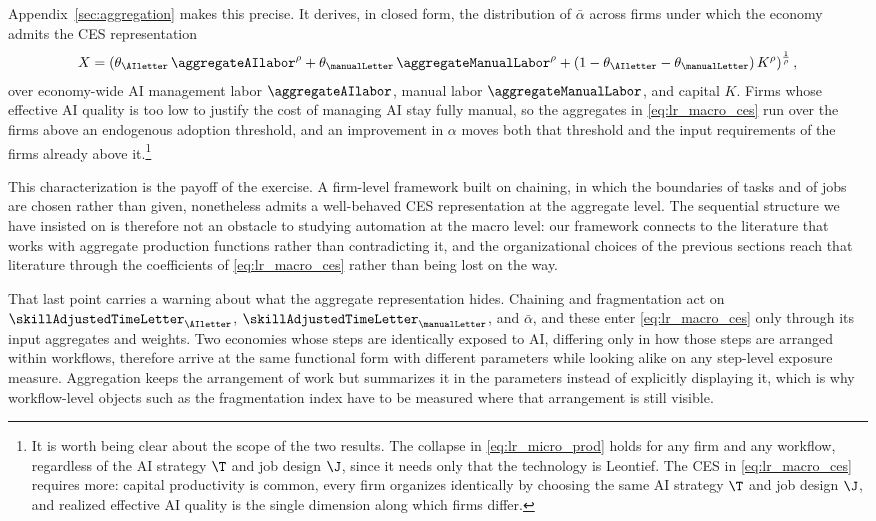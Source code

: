 Appendix~\ref{sec:aggregation} makes this precise.
It derives, in closed form, the distribution of $\bar{\alpha}$ across firms under which the economy admits the CES representation
\begin{align}
\label{eq:lr_macro_ces}
X = \left(\theta_{\AIletter}\,\aggregateAIlabor^{\rho} + \theta_{\manualLetter}\,\aggregateManualLabor^{\rho} + (1-\theta_{\AIletter}-\theta_{\manualLetter})\,K^{\rho}\right)^{\frac{1}{\rho}},
\end{align}
over economy-wide AI management labor $\aggregateAIlabor$, manual labor $\aggregateManualLabor$, and capital $K$.
Firms whose effective AI quality is too low to justify the cost of managing AI stay fully manual, so the aggregates in \eqref{eq:lr_macro_ces} run over the firms above an endogenous adoption threshold, and an improvement in $\alpha$ moves both that threshold and the input requirements of the firms already above it.\footnote{It is worth being clear about the scope of the two results.
The collapse in \eqref{eq:lr_micro_prod} holds for any firm and any workflow, regardless of the AI strategy $\T$ and job design $\J$, since it needs only that the technology is Leontief.
The CES in \eqref{eq:lr_macro_ces} requires more: capital productivity is common, every firm organizes identically by choosing the same AI strategy $\T$ and job design $\J$, and realized effective AI quality is the single dimension along which firms differ.}

This characterization is the payoff of the exercise.
A firm-level framework built on chaining, in which the boundaries of tasks and of jobs are chosen rather than given, nonetheless admits a well-behaved CES representation at the aggregate level.
The sequential structure we have insisted on is therefore not an obstacle to studying automation at the macro level: our framework connects to the literature that works with aggregate production functions rather than contradicting it, and the organizational choices of the previous sections reach that literature through the coefficients of \eqref{eq:lr_macro_ces} rather than being lost on the way.

That last point carries a warning about what the aggregate representation hides.
Chaining and fragmentation act on $\skillAdjustedTimeLetter_{\AIletter}$, $\skillAdjustedTimeLetter_{\manualLetter}$, and $\bar{\alpha}$, and these enter \eqref{eq:lr_macro_ces} only through its input aggregates and weights.
Two economies whose steps are identically exposed to AI, differing only in how those steps are arranged within workflows, therefore arrive at the same functional form with different parameters while looking alike on any step-level exposure measure.
Aggregation keeps the arrangement of work but summarizes it in the parameters instead of explicitly displaying it, which is why workflow-level objects such as the fragmentation index have to be measured where that arrangement is still visible.
